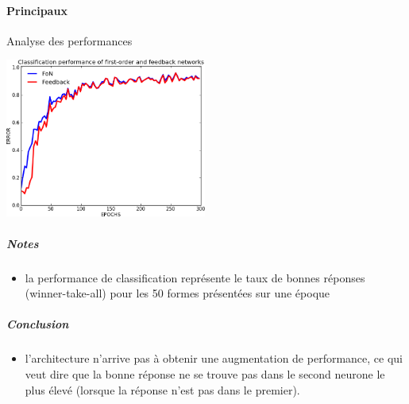     \paragraph{Principaux}
      Analyse des performances
      \begin{center}
	\includegraphics[width=250px]{data/expD1/perff.png}
      \end{center}
      \subparagraph{Notes}
	\begin{itemize}
	  \item la performance de classification représente le taux de bonnes réponses (winner-take-all) pour les 50 formes présentées sur une époque
	\end{itemize}
      \subparagraph{Conclusion}
	\begin{itemize}
	  \item l'architecture n'arrive pas à obtenir une augmentation de performance, ce qui veut dire que la bonne réponse ne se trouve pas dans
	  le second neurone le plus élevé (lorsque la réponse n'est pas dans le premier).
	\end{itemize}
